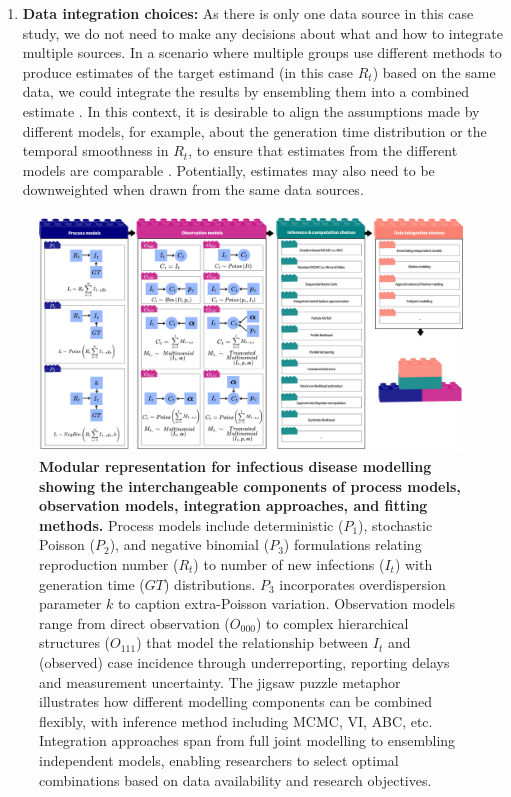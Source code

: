 \documentclass{article}
\begin{document}
\begin{enumerate}
\item \textbf{Data integration choices:} As there is only one data source in this case study, we do not need to make any decisions about what and how to integrate multiple sources. In a scenario where multiple groups use different methods to produce estimates of the target estimand (in this case $R_t$) based on the same data, we could integrate the results by ensembling them into a combined estimate \citep{maishman2022statistical,manley2024combining}. In this context, it is desirable to align the assumptions made by different models, for example, about the generation time distribution or the temporal smoothness in $R_t$, to ensure that estimates from the different models are comparable \citep{brockhaus2023why}. Potentially, estimates may also need to be downweighted when drawn from the same data sources.

 \end{enumerate}
 


\begin{figure}[htbp]
    \centering
    \includegraphics[width=\textwidth]{figures/Abbott et al figure 6.png}
    \caption{\textbf{Modular representation for infectious disease modelling showing the interchangeable components of process models, observation models, integration approaches, and fitting methods.} Process models include deterministic ($P_1$), stochastic Poisson ($P_2$), and negative binomial ($P_3$) formulations relating reproduction number ($R_t$) to number of new infections ($I_t$) with generation time ($GT$) distributions. $P_3$ incorporates overdispersion parameter $k$ to caption extra-Poisson variation. Observation models range from direct observation ($O_{000}$) to complex hierarchical structures ($O_{111}$) that model the relationship between $I_t$ and (observed) case incidence through underreporting, reporting delays and measurement uncertainty. The jigsaw puzzle metaphor illustrates how different modelling components can be combined flexibly, with inference method including \ac{MCMC}, \ac{VI}, \ac{ABC}, etc. Integration approaches span from full joint modelling to ensembling independent models, enabling researchers to select optimal combinations based on data availability and research objectives. }
    \label{fig:case_study_visual}
\end{figure}
\end{document}
